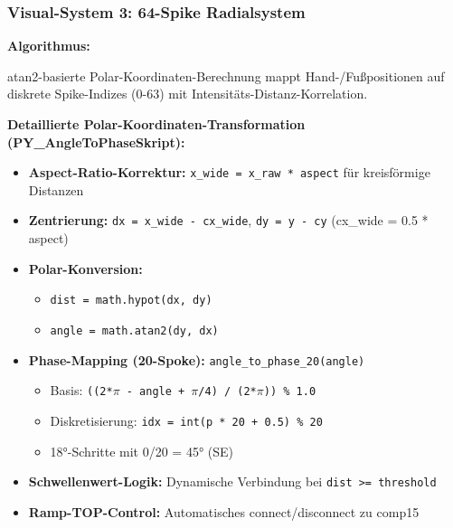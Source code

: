 \subsubsection{Visual-System 3: 64-Spike Radialsystem}


\textbf{Algorithmus:} \raggedright atan2-basierte Polar-Koordinaten-Berechnung mappt Hand-/Fußpositionen auf diskrete Spike-Indizes (0-63) mit Intensitäts-Distanz-Korrelation.

\textbf{Detaillierte Polar-Koordinaten-Transformation (PY\_AngleToPhaseSkript):}
\begin{itemize}
    \item \textbf{Aspect-Ratio-Korrektur:} \texttt{x\_wide = x\_raw * aspect} für kreisförmige Distanzen
    \item \textbf{Zentrierung:} \texttt{dx = x\_wide - cx\_wide}, \texttt{dy = y - cy} (cx\_wide = 0.5 * aspect)
    \item \textbf{Polar-Konversion:} 
    \begin{itemize}
        \item \texttt{dist = math.hypot(dx, dy)}
        \item \texttt{angle = math.atan2(dy, dx)}
    \end{itemize}
    \item \textbf{Phase-Mapping (20-Spoke):} \texttt{angle\_to\_phase\_20(angle)}
    \begin{itemize}
        \item Basis: \texttt{((2*$\pi$ - angle + $\pi$/4) / (2*$\pi$)) \% 1.0}
        \item Diskretisierung: \texttt{idx = int(p * 20 + 0.5) \% 20}
        \item 18°-Schritte mit 0/20 = 45° (SE)
    \end{itemize}
    \item \textbf{Schwellenwert-Logik:} Dynamische Verbindung bei \texttt{dist >= threshold}
    \item \textbf{Ramp-TOP-Control:} Automatisches connect/disconnect zu comp15
\end{itemize}


